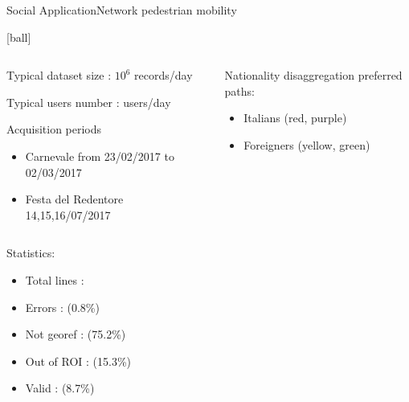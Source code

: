 \documentclass{standalone}
\begin{document}
\begin{frame}{Social Application}{Network pedestrian mobility}

  [ball]

  \begin{columns}

    \begin{column}{0.5\linewidth}

      \scriptsize{Typical dataset size : $10^6$ records/day}

      \scriptsize{Typical users number :  users/day}

      \vspace{.5cm}

      \scriptsize{Acquisition periods}

      \begin{itemize}
        \item Carnevale from 23/02/2017 to 02/03/2017
        \item Festa del Redentore 14,15,16/07/2017
      \end{itemize}

    \end{column}

    \begin{column}{0.5\linewidth}

      \scriptsize{Nationality disaggregation preferred paths:}

      \begin{itemize}
        \item Italians (red, purple)
        \item Foreigners (yellow, green)
      \end{itemize}

    \end{column}

  \end{columns}

  \begin{columns}

  \begin{column}{0.4\linewidth}

    Statistics:

    \begin{itemize}
      \item Total lines : 
      \item Errors :  (0.8\%)
      \item Not georef :  (75.2\%)
      \item Out of ROI :  (15.3\%)
      \item Valid :  (8.7\%)
    \end{itemize}


\end{column}
\end{columns}
\end{frame}
\end{document}
